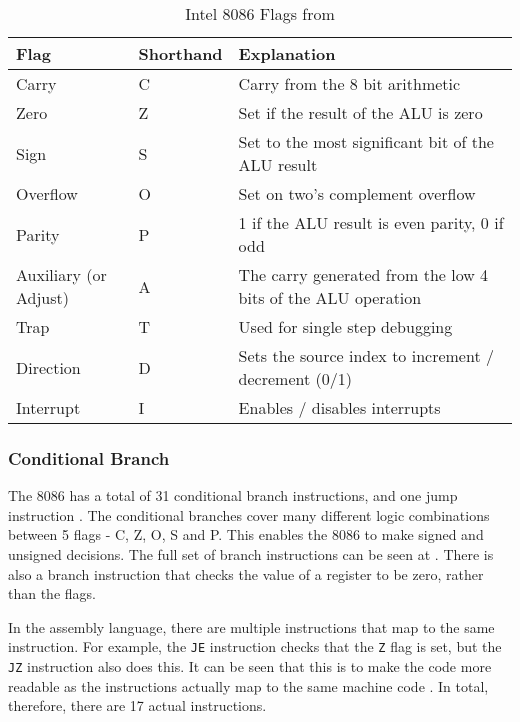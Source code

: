 \documentclass[12pt,a4paper]{article}
\begin{document}
\begin{bibunit}[is-unsrt]

\begin{table}
\centering
\caption{Intel 8086 Flags from \cite{Intel:flags}}
\label{tab:Intel:flags}
\begin{tabular}{p{}p{}p{}}\hline
Flag & Shorthand & Explanation \\ \hline
Carry & C & Carry from the 8 bit arithmetic \\
Zero & Z & Set if the result of the ALU is zero \\
Sign & S & Set to the most significant bit of the ALU result \\
Overflow & O & Set on two's complement overflow \\
Parity & P & 1 if the ALU result is even parity, 0 if odd \cite{flag:p} \\
Auxiliary (or Adjust) & A & The carry generated from the low 4 bits of the ALU operation \cite{flag:a}\\
Trap & T & Used for single step debugging \cite{flag:t} \\
Direction & D & Sets the source index to increment / decrement (0/1) \cite{flag:d} \\
Interrupt & I & Enables / disables interrupts \cite{flag:i} \\
\end{tabular}
\end{table}

\subsubsection{Conditional Branch}

The 8086 has a total of 31 conditional branch instructions, and one jump instruction \cite{Intel:instructionset}.
The conditional branches cover many different logic combinations between 5 flags - C, Z, O, S and P.
This enables the 8086 to make signed and unsigned decisions.
The full set of branch instructions can be seen at \cite{Intel:condjumps}.
There is also a branch instruction that checks the value of a register to be zero, rather than the flags. 

In the assembly language, there are multiple instructions that map to the same instruction.
For example, the \texttt{JE} instruction checks that the \texttt{Z} flag is set, but the \texttt{JZ} instruction also does this.
It can be seen that this is to make the code more readable as the instructions actually map to the same machine code \cite{Intel:datasheet}.
In total, therefore, there are 17 actual instructions.


\end{bibunit}
\end{document}
